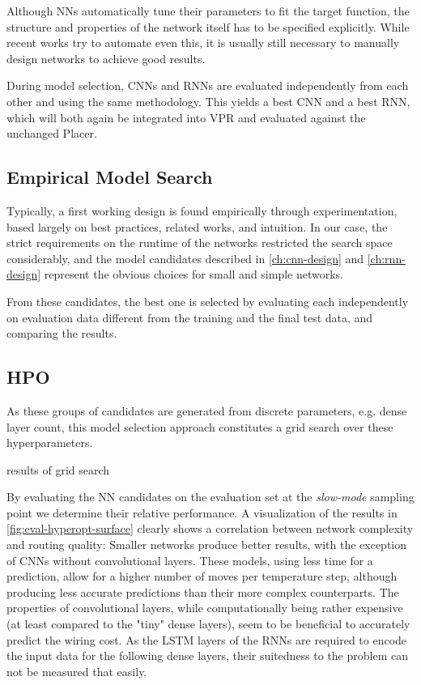 Although \glspl{NN} automatically tune their parameters to fit the target function, the structure and properties of the network itself has to be specified explicitly. While recent works try to automate even this, it is usually still necessary to manually design networks to achieve good results.

During model selection, \glspl{CNN} and \glspl{RNN} are evaluated independently from each other and using the same methodology. This yields a best \gls{CNN} and a best \gls{RNN}, which will both again be integrated into \gls{VPR} and evaluated against the unchanged Placer.  

\subsection{Empirical Model Search}

Typically, a first working design is found empirically through experimentation, based largely on best practices, related works, and intuition.\cite{TODO} In our case, the strict requirements on the runtime of the networks restricted the search space considerably, and the model candidates described in \ref{ch:cnn-design} and \ref{ch:rnn-design} represent the obvious choices for small and simple networks.

From these candidates, the best one is selected by evaluating each independently on evaluation data different from the training and the final test data, and comparing the results.

\subsection{\gls{HPO}}

As these groups of candidates are generated from discrete parameters, e.g. dense layer count, this model selection approach constitutes a grid search over these hyperparameters.

\cite{TODO} results of grid search

By evaluating the \gls{NN} candidates on the evaluation set at the \textit{slow-mode} sampling point we determine their relative performance. A visualization of the results in \ref{fig:eval-hyperopt-surface} clearly shows a correlation between network complexity and routing quality: Smaller networks produce better results, with the exception of \glspl{CNN} without convolutional layers. These models, using less time for a prediction, allow for a higher number of moves per temperature step, although producing less accurate predictions than their more complex counterparts. The properties of convolutional layers, while computationally being rather expensive (at least compared to the "tiny" dense layers), seem to be beneficial to accurately predict the wiring cost. As the \gls{LSTM} layers of the \glspl{RNN} are required to encode the input data for the following dense layers, their suitedness to the problem can not be measured that easily.

